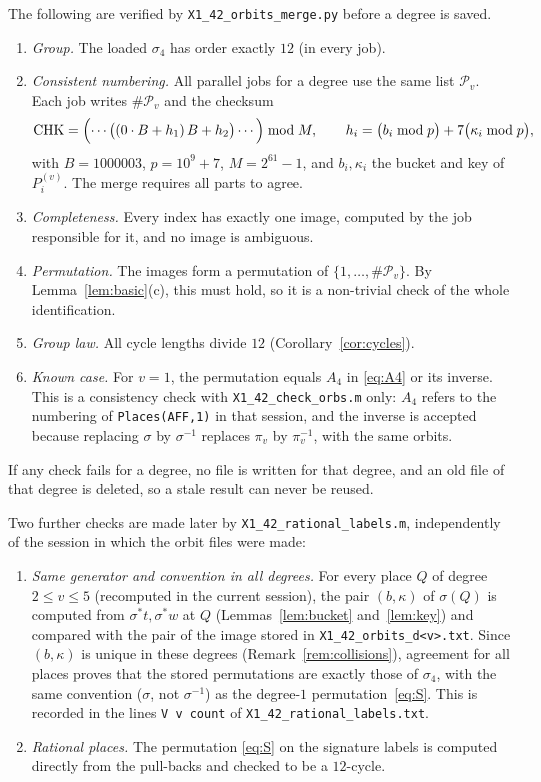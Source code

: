 \documentclass[11pt]{amsart}
\theoremstyle{definition}
\theoremstyle{remark}
\newcommand{\Pl}{\mathcal{P}}
\newcommand{\code}[1]{\texttt{#1}}
\begin{document}
The following are verified by \code{X1\_42\_orbits\_merge.py} before a degree is saved.
\begin{enumerate}[label=(C\arabic*)]
\item \emph{Group.} The loaded $\sigma_4$ has order exactly $12$ (in every job).
\item \emph{Consistent numbering.} All parallel jobs for a degree use the same list $\Pl_v$. Each job writes $\#\Pl_v$ and the checksum
\[
\mathrm{CHK}=\Bigl(\cdots\bigl((0\cdot B+h_1)\,B+h_2\bigr)\cdots\Bigr)\bmod M,\qquad h_i=\bigl(b_i\bmod p\bigr)+7\bigl(\kappa_i\bmod p\bigr),
\]
with $B=1000003$, $p=10^9+7$, $M=2^{61}-1$, and $b_i,\kappa_i$ the bucket and key of $P^{(v)}_i$. The merge requires all parts to agree.
\item \emph{Completeness.} Every index has exactly one image, computed by the job responsible for it, and no image is ambiguous.
\item \emph{Permutation.} The images form a permutation of $\{1,\dots,\#\Pl_v\}$. By Lemma~\ref{lem:basic}(c), this must hold, so it is a non-trivial check of the whole identification.
\item \emph{Group law.} All cycle lengths divide $12$ (Corollary~\ref{cor:cycles}).
\item \emph{Known case.} For $v=1$, the permutation equals $A_4$ in \eqref{eq:A4} or its inverse. This is a consistency check with \code{X1\_42\_check\_orbs.m} only: $A_4$ refers to the numbering of \code{Places(AFF,1)} in that session, and the inverse is accepted because replacing $\sigma$ by $\sigma^{-1}$ replaces $\pi_v$ by $\pi_v^{-1}$, with the same orbits.
\end{enumerate}
If any check fails for a degree, no file is written for that degree, and an old file of that degree is deleted, so a stale result can never be reused.

Two further checks are made later by \code{X1\_42\_rational\_labels.m}, independently of the session in which the orbit files were made:
\begin{enumerate}[label=(C\arabic*),resume]
\item \emph{Same generator and convention in all degrees.} For every place $Q$ of degree $2\le v\le5$ (recomputed in the current session), the pair $(b,\kappa)$ of $\sigma(Q)$ is computed from $\sigma^*t,\sigma^*w$ at $Q$ (Lemmas~\ref{lem:bucket} and~\ref{lem:key}) and compared with the pair of the image stored in \code{X1\_42\_orbits\_d<v>.txt}. Since $(b,\kappa)$ is unique in these degrees (Remark~\ref{rem:collisions}), agreement for all places proves that the stored permutations are exactly those of $\sigma_4$, with the same convention ($\sigma$, not $\sigma^{-1}$) as the degree-$1$ permutation~\eqref{eq:S}. This is recorded in the lines \code{V v count} of \code{X1\_42\_rational\_labels.txt}.
\item \emph{Rational places.} The permutation \eqref{eq:S} on the signature labels is computed directly from the pull-backs and checked to be a $12$-cycle.
\end{enumerate}
\end{document}
